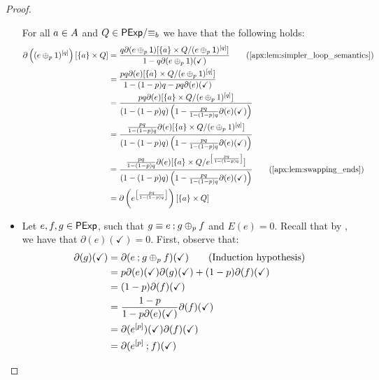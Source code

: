 \begin{proof}
\begin{itemize}
        For all $a \in {A}$ and $Q \in {\mathsf{PExp}}/{\equiv_b}$ we have that the following holds:
        \begin{align*}
            \partial \left( (e \oplus_p \one)^{[q]}\right)[\{a\} \times Q] &= \frac{q\partial(e \oplus_p \one)[\{a\} \times {Q}/{(e \oplus_p \one)^{[q]}}]}{1-q\partial(e \oplus_p \one)(\checkmark)} \tag{\Cref{apx:lem:simpler_loop_semantics}} \\
            &= \frac{pq\partial(e)[\{a\} \times {Q}/{(e \oplus_p \one)^{[q]}}]}{1-(1-p)q-pq\partial(e)(\checkmark)} \\
            &= \frac{pq\partial(e)[\{a\} \times {Q}/{(e \oplus_p 1)^{[q]}}]}{(1-(1-p)q)\left(1-\frac{pq}{1-(1-p)q}\partial(e)(\checkmark)\right)} \\
            &= \frac{\frac{pq}{1-(1-p)q}\partial(e)[\{a\} \times {Q}/{(e \oplus_p 1)^{[q]}}]}{(1-(1-p)q)\left(1-\frac{pq}{1-(1-p)q}\partial(e)(\checkmark)\right)} \\
            &= \frac{\frac{pq}{1-(1-p)q}\partial(e)[\{a\} \times {Q}/{e^{\left[\frac{pq}{1-(1-p)q}\right]}}]}{(1-(1-p)q)\left(1-\frac{pq}{1-(1-p)q}\partial(e)(\checkmark)\right)} \tag{\Cref{apx:lem:swapping_ends}}\\
            &=\partial\left(e^{\left[\frac{pq}{1-(1-p)q}\right]}\right)[\{a\} \times Q]
        \end{align*}

        \item[]  Let $e,f,g \in \mathsf{PExp}$, such that $g \equiv e\mathbin{;} g \oplus_p f$ and $E(e) = 0$. Recall that by , we have that $\partial(e)(\checkmark)=0$. First, observe that:
        \begin{align*}
            \partial(g)(\checkmark) &= \partial(e \mathbin{;} g \oplus_p f)(\checkmark) \tag{Induction hypothesis} \\
            &=p \partial(e)(\checkmark)\partial(g)(\checkmark) + (1-p)\partial(f)(\checkmark) \\
            &= (1-p)\partial(f)(\checkmark) \\
            &= \frac{1-p}{1-p\partial(e)(\checkmark)}\partial(f)(\checkmark) \\
            &= \partial(e^{[p]})(\checkmark)\partial(f)(\checkmark)\\
            &= \partial(e^{[p]} \mathbin{;} f)(\checkmark)
        \end{align*}


\end{itemize}
\end{proof}
